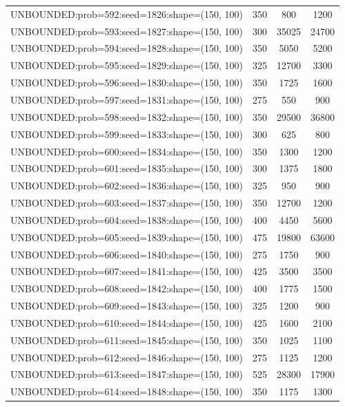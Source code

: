 \begin{longtable}{lccc}
UNBOUNDED:prob=592:seed=1826:shape=(150, 100) &      350 &   800 &   1200 \\
UNBOUNDED:prob=593:seed=1827:shape=(150, 100) &      300 & 35025 &  24700 \\
UNBOUNDED:prob=594:seed=1828:shape=(150, 100) &      350 &  5050 &   5200 \\
UNBOUNDED:prob=595:seed=1829:shape=(150, 100) &      325 & 12700 &   3300 \\
UNBOUNDED:prob=596:seed=1830:shape=(150, 100) &      350 &  1725 &   1600 \\
UNBOUNDED:prob=597:seed=1831:shape=(150, 100) &      275 &   550 &    900 \\
UNBOUNDED:prob=598:seed=1832:shape=(150, 100) &      350 & 29500 &  36800 \\
UNBOUNDED:prob=599:seed=1833:shape=(150, 100) &      300 &   625 &    800 \\
UNBOUNDED:prob=600:seed=1834:shape=(150, 100) &      350 &  1300 &   1200 \\
UNBOUNDED:prob=601:seed=1835:shape=(150, 100) &      300 &  1375 &   1800 \\
UNBOUNDED:prob=602:seed=1836:shape=(150, 100) &      325 &   950 &    900 \\
UNBOUNDED:prob=603:seed=1837:shape=(150, 100) &      350 & 12700 &   1200 \\
UNBOUNDED:prob=604:seed=1838:shape=(150, 100) &      400 &  4450 &   5600 \\
UNBOUNDED:prob=605:seed=1839:shape=(150, 100) &      475 & 19800 &  63600 \\
UNBOUNDED:prob=606:seed=1840:shape=(150, 100) &      275 &  1750 &    900 \\
UNBOUNDED:prob=607:seed=1841:shape=(150, 100) &      425 &  3500 &   3500 \\
UNBOUNDED:prob=608:seed=1842:shape=(150, 100) &      400 &  1775 &   1500 \\
UNBOUNDED:prob=609:seed=1843:shape=(150, 100) &      325 &  1200 &    900 \\
UNBOUNDED:prob=610:seed=1844:shape=(150, 100) &      425 &  1600 &   2100 \\
UNBOUNDED:prob=611:seed=1845:shape=(150, 100) &      350 &  1025 &   1100 \\
UNBOUNDED:prob=612:seed=1846:shape=(150, 100) &      275 &  1125 &   1200 \\
UNBOUNDED:prob=613:seed=1847:shape=(150, 100) &      525 & 28300 &  17900 \\
UNBOUNDED:prob=614:seed=1848:shape=(150, 100) &      350 &  1175 &   1300 \\

\end{longtable}
